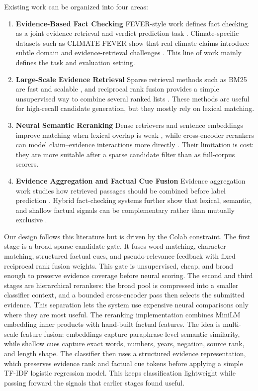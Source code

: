 \documentclass[11pt]{article}
\begin{document}
Existing work can be organized into four areas:
\begin{enumerate}
    \item \textbf{Evidence-Based Fact Checking}
    FEVER-style work defines fact checking as a joint evidence retrieval and
    verdict prediction task \citep{thorne2018fever}.  Climate-specific datasets
    such as CLIMATE-FEVER show that real climate claims introduce subtle domain
    and evidence-retrieval challenges \citep{diggelmann2020climatefever}.  This
    line of work mainly defines the task and evaluation setting.

    \item \textbf{Large-Scale Evidence Retrieval}
    Sparse retrieval methods such as BM25 are fast and scalable
    \citep{robertson1994okapi}, and reciprocal rank fusion provides a simple
    unsupervised way to combine several ranked lists \citep{cormack2009rrf}.
    These methods are useful for high-recall candidate generation, but they
    mostly rely on lexical matching.

    \item \textbf{Neural Semantic Reranking}
    Dense retrievers and sentence embeddings improve matching when lexical
    overlap is weak \citep{karpukhin2020dpr,reimers2019sentence}, while
    cross-encoder rerankers can model claim--evidence interactions more directly
    \citep{nogueira2019bert}.  Their limitation is cost: they are more suitable
    after a sparse candidate filter than as full-corpus scorers.

    \item \textbf{Evidence Aggregation and Factual Cue Fusion}
    Evidence aggregation work studies how retrieved passages should be combined
    before label prediction \citep{zhou2019gear}.  Hybrid fact-checking systems
    further show that lexical, semantic, and shallow factual signals can be
    complementary rather than mutually exclusive
    \citep{lee2018improving,padia2018umbc}.
\end{enumerate}

Our design follows this literature but is driven by the Colab constraint.  The
first stage is a broad sparse candidate gate.  It fuses word matching,
character matching, structured factual cues, and pseudo-relevance feedback with
fixed reciprocal rank fusion weights.  This gate is unsupervised, cheap, and
broad enough to preserve evidence coverage before neural scoring.  The second
and third stages are hierarchical rerankers: the broad pool is compressed into
a smaller classifier context, and a bounded cross-encoder pass then selects the
submitted evidence.  This separation lets the system use expensive neural
comparisons only where they are most useful.  The reranking implementation combines
MiniLM embedding inner products with hand-built factual features.  The idea is
multi-scale feature fusion: embeddings capture paraphrase-level semantic
similarity, while shallow cues capture exact words, numbers, years, negation,
source rank, and length shape.  The classifier then uses a structured evidence
representation, which preserves evidence rank and factual cue tokens before
applying a simple TF-IDF logistic regression model.  This keeps classification
lightweight while passing forward the signals that earlier stages found useful.
\end{document}
